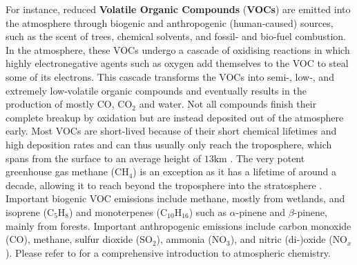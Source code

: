 For instance, reduced \textbf{Volatile Organic Compounds} (\textbf{VOCs}) are emitted into the atmosphere through biogenic and anthropogenic (human-caused) sources, such as the scent of trees, chemical solvents, and fossil- and bio-fuel combustion. In the atmosphere, these VOCs undergo a cascade of oxidising reactions in which highly electronegative agents such as oxygen add themselves to the VOC to steal some of its electrons. This cascade transforms the VOCs into semi-, low-, and extremely low-volatile organic compounds and eventually results in the production of mostly $\text{CO}$, $\text{CO}_2$ and water. Not all compounds finish their complete breakup by oxidation but are instead deposited out of the atmosphere early. Most VOCs are short-lived because of their short chemical lifetimes and high deposition rates and can thus usually only reach the troposphere, which spans from the surface to an average height of $13 \text{km}$ \cite[p.~14]{atmospheric-chemistry-1999}. The very potent greenhouse gas methane ($\text{CH}_4$) is an exception as it has a lifetime of around a decade, allowing it to reach beyond the troposphere into the stratosphere \cite{methane-hydrates-2017, atmospheric-chemistry-1999}. Important biogenic VOC emissions include methane, mostly from wetlands, and isoprene ($\text{C}_5\text{H}_8$) and monoterpenes ($\text{C}_{10}\text{H}_{16}$) such as $\alpha$-pinene and $\beta$-pinene, mainly from forests. Important anthropogenic emissions include carbon monoxide ($\text{CO}$), methane, sulfur dioxide ($\text{SO}_2$), ammonia ($\text{NO}_3$), and nitric (di-)oxide ($\text{NO}_{x}$). Please refer to \textcite{atmospheric-chemistry-1999} for a comprehensive introduction to atmospheric chemistry. %

